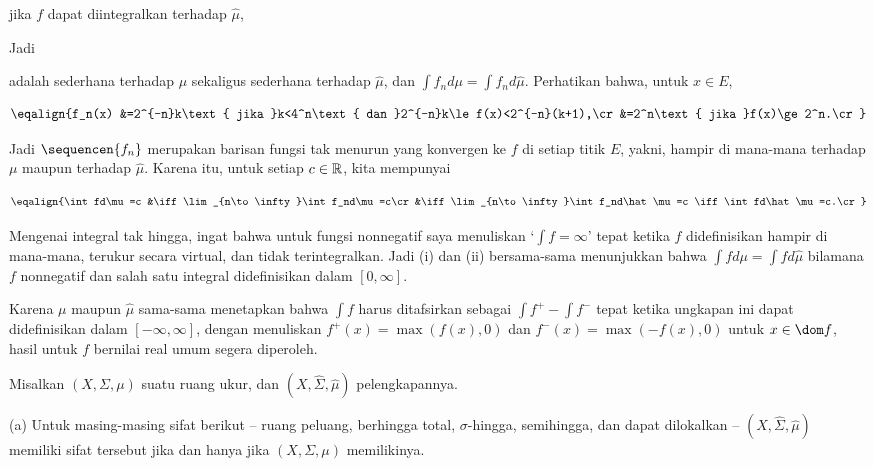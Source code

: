 {

\noindent jika $f$ dapat diintegralkan terhadap $\hat\mu$,


\noindent Jadi


\noindent adalah sederhana terhadap $\mu$ sekaligus sederhana terhadap $\hat\mu$, dan
$\int f_nd\mu=\int f_nd\hat\mu$. Perhatikan bahwa, untuk $x\in E$,

$$\eqalign{f_n(x)
&=2^{-n}k\text{ jika }k<4^n\text{ dan }2^{-n}k\le f(x)<2^{-n}(k+1),\cr
&=2^n\text{ jika }f(x)\ge 2^n.\cr}$$

\noindent Jadi $\sequencen{f_n}$ merupakan barisan fungsi tak menurun
yang konvergen ke $f$ di setiap titik $E$, yakni, hampir di mana-mana
terhadap $\mu$ maupun terhadap $\hat\mu$. Karena itu, untuk setiap
$c\in\Bbb R$, kita mempunyai

$$\eqalign{\int fd\mu=c
&\iff\lim_{n\to\infty}\int f_nd\mu=c\cr
&\iff\lim_{n\to\infty}\int f_nd\hat\mu=c
\iff\int fd\hat\mu=c.\cr}$$

\medskip

 Mengenai integral tak hingga, ingat bahwa untuk fungsi
nonnegatif saya menuliskan `$\int f=\infty$' tepat ketika $f$
didefinisikan hampir di mana-mana, terukur secara virtual, dan tidak
terintegralkan. Jadi (i) dan (ii) bersama-sama menunjukkan bahwa
$\int fd\mu=\int fd\hat\mu$ bilamana $f$ nonnegatif dan salah satu
integral didefinisikan dalam $[0,\infty]$.

\medskip

 Karena $\mu$ maupun $\hat\mu$ sama-sama menetapkan bahwa
$\int f$ harus ditafsirkan sebagai $\int f^+-\int f^-$ tepat ketika
ungkapan ini dapat didefinisikan dalam $[-\infty,\infty]$, dengan
menuliskan $f^+(x)=\max(f(x),0)$ dan $f^-(x)=\max(-f(x),0)$ untuk
$x\in\dom f$, hasil untuk $f$ bernilai real umum segera diperoleh.
}%

 Misalkan $(X,\Sigma,\mu)$ suatu ruang ukur,
dan $(X,\hat\Sigma,\hat\mu)$ pelengkapannya.

(a) Untuk masing-masing sifat berikut -- ruang peluang, berhingga total,
$\sigma$-hingga, semihingga, dan dapat dilokalkan --
$(X,\hat\Sigma,\hat\mu)$ memiliki sifat tersebut jika dan hanya jika
$(X,\Sigma,\mu)$ memilikinya.

